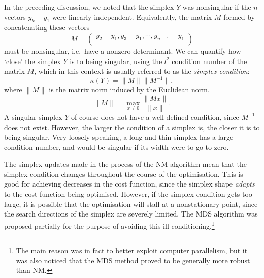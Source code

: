 In the preceding discussion, we noted that the simplex $Y$ was nonsingular if the $n$ vectors $y_k - y_1$ were linearly independent.
Equivalently, the matrix $M$ formed by concatenating these vectors
\begin{equation}
    \label{eq:simplex_matrix}
    M = \begin{pmatrix}
        y_2 - y_1, y_3 - y_1, \cdots, y_{n+1} - y_1 \\
    \end{pmatrix}
\end{equation}
must be nonsingular, i.e.\ have a nonzero determinant.
We can quantify how `close' the simplex $Y$ is to being singular, using the $l^2$ condition number of the matrix $M$, which in this context is usually referred to as the \textit{simplex condition}:
\begin{equation}
    \label{eq:simplex_condition}
    \kappa(Y) = \lVert M \rVert \lVert M^{-1} \rVert,
\end{equation}
where $\lVert M \rVert$ is the matrix norm induced by the Euclidean norm,
\begin{equation}
    \label{eq:matrix_norm}
    \lVert M \rVert = \max_{x \neq 0} \frac{\lVert Mx \rVert}{\lVert x \rVert}.
\end{equation}
A singular simplex $Y$ of course does not have a well-defined condition, since $M^{-1}$ does not exist.
However, the larger the condition of a simplex is, the closer it is to being singular.
Very loosely speaking, a long and thin simplex has a large condition number, and would be singular if its width were to go to zero.

The simplex updates made in the process of the NM algorithm mean that the simplex condition changes throughout the course of the optimisation.
This is good for achieving decreases in the cost function, since the simplex shape \textit{adapts} to the cost function being optimised.
However, if the simplex condition gets too large, it is possible that the optimisation will stall at a nonstationary point, since the search directions of the simplex are severely limited.
The MDS algorithm was proposed partially for the purpose of avoiding this ill-conditioning.\footnote{The main reason was in fact to better exploit computer parallelism, but it was also noticed that the MDS method proved to be generally more robust than NM.}

